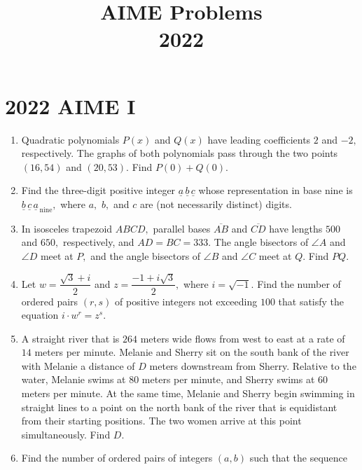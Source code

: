 \documentclass{article}
\title{AIME Problems \\ 2022}
\date{}
\begin{document}
\maketitle\thispagestyle{fancy}\newpage\section*{2022 AIME I}
\begin{enumerate}[label=\arabic*., itemsep=0.5em]
\item Quadratic polynomials \(P(x)\) and \(Q(x)\) have leading coefficients \(2\) and \(-2,\) respectively. The graphs of both polynomials pass through the two points \((16,54)\) and \((20,53).\) Find \(P(0) + Q(0).\)\par \vspace{0.5em}\item Find the three-digit positive integer \(\underline{a}\,\underline{b}\,\underline{c}\) whose representation in base nine is \(\underline{b}\,\underline{c}\,\underline{a}_{\,\text{nine}},\) where \(a,\) \(b,\) and \(c\) are (not necessarily distinct) digits.\par \vspace{0.5em}\item In isosceles trapezoid \(ABCD,\) parallel bases \(\overline{AB}\) and \(\overline{CD}\) have lengths \(500\) and \(650,\) respectively, and \(AD=BC=333.\) The angle bisectors of \(\angle A\) and \(\angle D\) meet at \(P,\) and the angle bisectors of \(\angle B\) and \(\angle C\) meet at \(Q.\) Find \(PQ.\)\par \vspace{0.5em}\item Let \(w = \dfrac{\sqrt{3} + i}{2}\) and \(z = \dfrac{-1 + i\sqrt{3}}{2},\) where \(i = \sqrt{-1}.\) Find the number of ordered pairs \((r,s)\) of positive integers not exceeding \(100\) that satisfy the equation \(i \cdot w^r = z^s.\)\par \vspace{0.5em}\item A straight river that is \(264\) meters wide flows from west to east at a rate of \(14\) meters per minute. Melanie and Sherry sit on the south bank of the river with Melanie a distance of \(D\) meters downstream from Sherry. Relative to the water, Melanie swims at \(80\) meters per minute, and Sherry swims at \(60\) meters per minute. At the same time, Melanie and Sherry begin swimming in straight lines to a point on the north bank of the river that is equidistant from their starting positions. The two women arrive at this point simultaneously. Find \(D.\)\par \vspace{0.5em}\item Find the number of ordered pairs of integers \((a,b)\) such that the sequence 

\end{enumerate}
\end{document}
